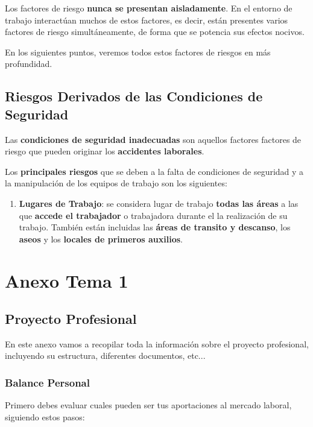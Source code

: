 Los factores de riesgo \textbf{nunca se presentan aisladamente}. En el entorno de trabajo interactúan muchos de estos factores, es decir, están presentes varios factores de riesgo simultáneamente, de forma que se potencia sus efectos nocivos.

En los siguientes puntos, veremos todos estos factores de riesgos en más profundidad.

\section{Riesgos Derivados de las Condiciones de Seguridad}
Las \textbf{condiciones de seguridad inadecuadas} son aquellos factores factores de riesgo que pueden originar los \textbf{accidentes laborales}.

Los \textbf{principales riesgos }que se deben a la falta de condiciones de seguridad y a la manipulación de los equipos de trabajo son los siguientes:

\begin{enumerate}
    \item \textbf{Lugares de Trabajo}: se considera lugar de trabajo \textbf{todas las áreas} a las que \textbf{accede el trabajador} o trabajadora durante el la realización de su trabajo. También están incluidas las \textbf{áreas de transito y descanso}, los \textbf{aseos} y los \textbf{locales de primeros auxilios}.
\end{enumerate}




\chapter{Anexo Tema 1}

\section{Proyecto Profesional}
En este anexo vamos a recopilar toda la información sobre el proyecto profesional, incluyendo su estructura, diferentes documentos, etc...

\subsection{Balance Personal}
Primero debes evaluar cuales pueden ser tus aportaciones al mercado laboral, siguiendo estos pasos:

